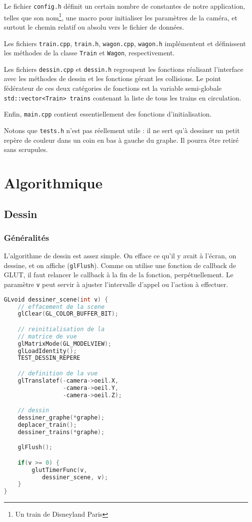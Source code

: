 \documentclass[a4paper, oneside, 11pt, twocolumn]{article}
\begin{document}
Le fichier \texttt{config.h} définit un certain nombre de constantes de notre application, telles que son nom\footnote{Un train de Disneyland Paris}, une macro pour initialiser les paramètres de la caméra, et {\large surtout} le chemin relatif ou absolu vers le fichier de données.

Les fichiers \texttt{train.cpp}, \texttt{train.h}, \texttt{wagon.cpp}, \texttt{wagon.h} implémentent et définissent les méthodes de la classe \texttt{Train} et \texttt{Wagon}, respectivement.

Les fichiers \texttt{dessin.cpp} et \texttt{dessin.h} regroupent les fonctions réalisant l'interface avec les méthodes de dessin et les fonctions gérant les collisions. Le point fédérateur de ces deux catégories de fonctions est la variable semi-globale \texttt{std::vector<Train> trains} contenant la liste de tous les trains en circulation.

Enfin, \texttt{main.cpp} contient essentiellement des fonctions d'initialisation.

Notons que \texttt{tests.h} n'est pas réellement utile : il ne sert qu'à dessiner un petit repère de couleur dans un coin en bas à gauche du graphe. Il pourra être retiré sans scrupules.


\section{Algorithmique}

\subsection{Dessin}

\subsubsection{Généralités}

L'algorithme de dessin est assez simple. On efface ce qu'il y avait à l'écran, on dessine, et on affiche (\texttt{glFlush}). Comme on utilise une fonction de callback de GLUT, il faut relancer le callback à la fin de la fonction, perpétuellement. Le paramètre \texttt{v} peut servir à ajuster l'intervalle d'appel ou l'action à effectuer.

\begin{lstlisting}[language=C++, float=bth, caption={Ordre de dessin}, label=dessinScene, basicstyle=\small]
GLvoid dessiner_scene(int v) {
    // effacement de la scene
    glClear(GL_COLOR_BUFFER_BIT);

    // reinitialisation de la
    // matrice de vue
    glMatrixMode(GL_MODELVIEW);
    glLoadIdentity();
    TEST_DESSIN_REPERE

    // definition de la vue
    glTranslatef(-camera->oeil.X,
                 -camera->oeil.Y,
                 -camera->oeil.Z);

    // dessin
    dessiner_graphe(*graphe);
    deplacer_train();
    dessiner_trains(*graphe);

    glFlush();

    if(v >= 0) {
        glutTimerFunc(v,
           dessiner_scene, v);
    }
}
\end{lstlisting}
\end{document}
